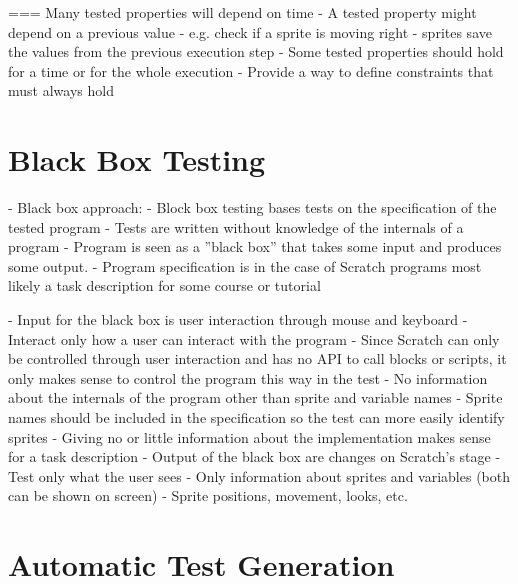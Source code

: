 === Many tested properties will depend on time
- A tested property might depend on a previous value
    - e.g. check if a sprite is moving right
    - sprites save the values from the previous execution step
- Some tested properties should hold for a time or for the whole execution
    - Provide a way to define constraints that must always hold

\section{Black Box Testing}

- Black box approach:
    - Block box testing bases tests on the specification of the tested program
    - Tests are written without knowledge of the internals of a program
    - Program is seen as a ''black box'' that takes some input and produces some output.
    - Program specification is in the case of Scratch programs most likely a task description for some course or tutorial

    - Input for the black box is user interaction through mouse and keyboard
    - Interact only how a user can interact with the program
        - Since Scratch can only be controlled through user interaction and has no API to call blocks or scripts,
          it only makes sense to control the program this way in the test
        - No information about the internals of the program other than sprite and variable names
            - Sprite names should be included in the specification so the test can more easily identify sprites
            - Giving no or little information about the implementation makes sense for a task description
    - Output of the black box are changes on Scratch's stage
    - Test only what the user sees
        - Only information about sprites and variables (both can be shown on screen)
        - Sprite positions, movement, looks, etc.

\section{Automatic Test Generation}%
\label{sec:automatic_test_generation}

